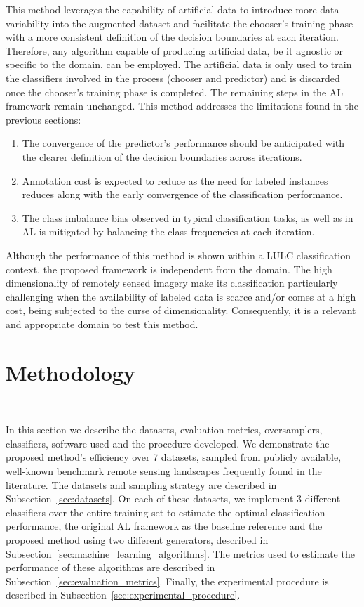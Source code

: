 \documentclass[preprint,12pt]{elsarticle}
\begin{document}
This method leverages the capability of artificial data to introduce more data
variability into the augmented dataset and facilitate the chooser's training
phase with a more consistent definition of the decision boundaries at each
iteration. Therefore, any algorithm capable of producing artificial data, be
it agnostic or specific to the domain, can be employed. The artificial data is
only used to train the classifiers involved in the process (chooser and
predictor) and is discarded once the chooser's training phase is completed.
The remaining steps in the AL framework remain unchanged. This method
addresses the limitations found in the previous sections: 

\begin{enumerate}
    \item The convergence of the predictor's performance should be anticipated
        with the clearer definition of the decision boundaries across
        iterations.
    \item Annotation cost is expected to reduce as the need for labeled
        instances reduces along with the early convergence of the
        classification performance.
    \item The class imbalance bias observed in typical classification tasks, as
        well as in AL is mitigated by balancing the class frequencies at each
        iteration.
\end{enumerate}

Although the performance of this method is shown within a LULC classification
context, the proposed framework is independent from the domain. The high
dimensionality of remotely sensed imagery make its classification particularly
challenging when the availability of labeled data is scarce and/or comes at a
high cost, being subjected to the curse of dimensionality. Consequently, it is
a relevant and appropriate domain to test this method.

\section{Methodology}~\label{sec:methodology}

In this section we describe the datasets, evaluation metrics, oversamplers,
classifiers, software used and the procedure developed. We demonstrate the
proposed method's efficiency over 7 datasets, sampled from publicly available,
well-known benchmark remote sensing landscapes frequently found in the
literature. The datasets and sampling strategy are described in
Subsection~\ref{sec:datasets}. On each of these datasets, we implement 3
different classifiers over the entire training set to estimate the optimal
classification performance, the original AL framework as the baseline
reference and the proposed method using two different generators, described in
Subsection~\ref{sec:machine_learning_algorithms}. The metrics used to estimate
the performance of these algorithms are described in
Subsection~\ref{sec:evaluation_metrics}. Finally, the experimental procedure is
described in Subsection~\ref{sec:experimental_procedure}. 
\end{document}
